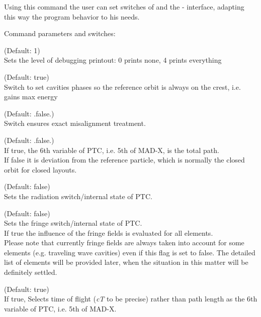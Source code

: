 Using this command the user can set switches of \ptc and the {\madx}-{\ptc}
interface, adapting this way the program behavior to his needs.   

Command parameters and switches:
\begin{madlist}
    (Default: 1)\\
     Sets the level of debugging printout: 0 prints none, 4 prints everything   

    (Default: true)\\
     Switch to set cavities phases so the reference orbit is always on
     the crest, i.e. gains max energy    

    (Default: .false.)\\
     Switch ensures exact misalignment treatment.   

    (Default: .false.)\\
     If true, the 6th variable of PTC, i.e. 5th of MAD-X, is the total
     path.  \\
     If false it is deviation from the reference particle,
     which is normally the closed orbit for closed layouts.    

    (Default: false)\\    
     Sets the radiation switch/internal state of PTC.   

    (Default: false)\\    
     Sets the fringe switch/internal state of PTC. \\ 
     If true the influence of the fringe fields is evaluated for all
     elements. \\       
     Please note that currently fringe fields are always taken into
     account for some elements (e.g. traveling wave cavities) even if
     this flag is set to false. The detailed list of elements
     will be provided later, when the situation in this matter will be
     definitely settled.    

    (Default: true)\\  
     If true, Selects time of flight (\textit{cT} to be precise) rather
     than path length as the 6th variable of PTC, i.e. 5th of MAD-X.     

\end{madlist}


